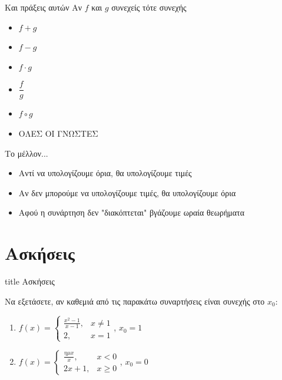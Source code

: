 \documentclass{presentation}
\begin{document}
\begin{frame}{Και πράξεις αυτών}
  Αν $f$ και $g$ συνεχείς τότε συνεχής
  \begin{itemize}[<+->]
    \item $f+g$
    \item $f-g$
    \item $f\cdot g$
    \item $\dfrac{f}{g}$
    \item $f\circ g$
    \item ΟΛΕΣ ΟΙ ΓΝΩΣΤΕΣ
  \end{itemize}
\end{frame}

\begin{frame}{Το μέλλον...}
  \begin{itemize}[<+->]
    \item Αντί να υπολογίζουμε όρια, θα υπολογίζουμε τιμές
    \item Αν δεν μπορούμε να υπολογίζουμε τιμές, θα υπολογίζουμε όρια
    \item Αφού η συνάρτηση δεν "διακόπτεται" βγάζουμε ωραία θεωρήματα
  \end{itemize}
\end{frame}


\section{Ασκήσεις}

\begin{frame}[noframenumbering]
  \vfill
  \centering
  \begin{beamercolorbox}[sep=8pt,center,shadow=true,rounded=true]{title}
    Ασκήσεις
  \end{beamercolorbox}
  \vfill
\end{frame}

\begin{askisi}
  Να εξετάσετε, αν καθεμιά από τις παρακάτω συναρτήσεις είναι συνεχής στο $x_0$:
  \begin{enumerate}[<+->]
    \item $f(x)=\begin{cases}
              \frac{x^2-1}{x-1}, & x\ne 1 \\
              2,                 & x=1
            \end{cases}$, $x_0=1$
    \item $f(x)=\begin{cases}
              \frac{ημx}{x}, & x<0    \\
              2x+1,          & x\ge 0
            \end{cases}$, $x_0=0$
  \end{enumerate}

\end{askisi}
\end{document}
